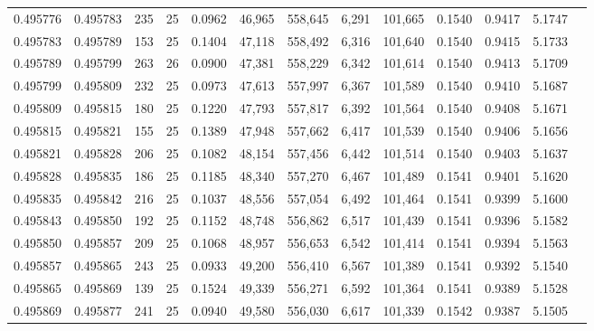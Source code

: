\begin{tabular}{rrrrrrrrrrrrr}
0.495776 & 0.495783 & 235 &  25 &                                     0.0962 &  46,965 & 558,645 &   6,291 & 101,665 & 0.1540 & 0.9417 & 5.1747 \\
0.495783 & 0.495789 & 153 &  25 &                                     0.1404 &  47,118 & 558,492 &   6,316 & 101,640 & 0.1540 & 0.9415 & 5.1733 \\
0.495789 & 0.495799 & 263 &  26 &                                     0.0900 &  47,381 & 558,229 &   6,342 & 101,614 & 0.1540 & 0.9413 & 5.1709 \\
0.495799 & 0.495809 & 232 &  25 &                                     0.0973 &  47,613 & 557,997 &   6,367 & 101,589 & 0.1540 & 0.9410 & 5.1687 \\
0.495809 & 0.495815 & 180 &  25 &                                     0.1220 &  47,793 & 557,817 &   6,392 & 101,564 & 0.1540 & 0.9408 & 5.1671 \\
0.495815 & 0.495821 & 155 &  25 &                                     0.1389 &  47,948 & 557,662 &   6,417 & 101,539 & 0.1540 & 0.9406 & 5.1656 \\
0.495821 & 0.495828 & 206 &  25 &                                     0.1082 &  48,154 & 557,456 &   6,442 & 101,514 & 0.1540 & 0.9403 & 5.1637 \\
0.495828 & 0.495835 & 186 &  25 &                                     0.1185 &  48,340 & 557,270 &   6,467 & 101,489 & 0.1541 & 0.9401 & 5.1620 \\
0.495835 & 0.495842 & 216 &  25 &                                     0.1037 &  48,556 & 557,054 &   6,492 & 101,464 & 0.1541 & 0.9399 & 5.1600 \\
0.495843 & 0.495850 & 192 &  25 &                                     0.1152 &  48,748 & 556,862 &   6,517 & 101,439 & 0.1541 & 0.9396 & 5.1582 \\
0.495850 & 0.495857 & 209 &  25 &                                     0.1068 &  48,957 & 556,653 &   6,542 & 101,414 & 0.1541 & 0.9394 & 5.1563 \\
0.495857 & 0.495865 & 243 &  25 &                                     0.0933 &  49,200 & 556,410 &   6,567 & 101,389 & 0.1541 & 0.9392 & 5.1540 \\
0.495865 & 0.495869 & 139 &  25 &                                     0.1524 &  49,339 & 556,271 &   6,592 & 101,364 & 0.1541 & 0.9389 & 5.1528 \\
0.495869 & 0.495877 & 241 &  25 &                                     0.0940 &  49,580 & 556,030 &   6,617 & 101,339 & 0.1542 & 0.9387 & 5.1505 \\

\end{tabular}
